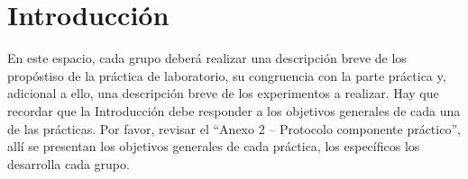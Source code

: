 \section{Introducción}

En este espacio, cada grupo deberá realizar una descripción breve de los propóstiso de
la práctica de laboratorio, su congruencia con la parte práctica y, adicional a ello, una
descripción breve de los experimentos a realizar. Hay que recordar que la Introducción
debe responder a los objetivos generales de cada una de las prácticas. Por favor, revisar 
el ``Anexo 2 – Protocolo componente práctico'', allí se presentan los objetivos generales 
de cada práctica, los específicos los desarrolla cada grupo.